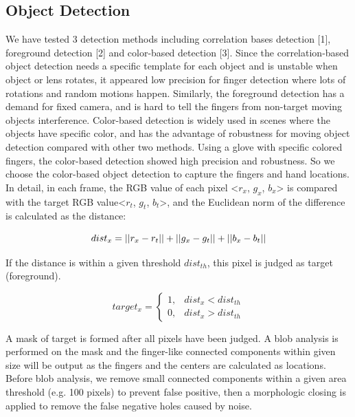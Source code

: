\documentclass[10pt,twocolumn,letterpaper]{article}
\begin{document}
\subsection{Object Detection}

We have tested 3 detection methods including correlation bases detection [1], foreground detection [2] and color-based detection [3]. Since the correlation-based object detection needs a specific template for each object and is unstable when object or lens rotates, it appeared low precision for finger detection where lots of rotations and random motions happen. Similarly, the foreground detection has a demand for fixed camera, and is hard to tell the fingers from non-target moving objects interference. Color-based detection is widely used in scenes where the objects have specific color, and has the advantage of robustness for moving object detection compared with other two methods. Using a glove with specific colored fingers, the color-based detection showed high precision and robustness. So we choose the color-based object detection to capture the fingers and hand locations. In detail, in each frame, the RGB value of each pixel <$r_x$, $g_x$, $b_x$> is compared with the target RGB value<$r_t$, $g_t$, $b_t$>, and the Euclidean norm of the difference is calculated as the distance:

\begin{equation}
dist_x=||r_x-r_t||+||g_x-g_t||+||b_x-b_t||\\
\end{equation}

If the distance is within a given threshold $dist_{th}$, this pixel is judged as target (foreground).

\begin{equation}
	target_x=
\begin{cases}
	1, & dist_x<dist_{th}\\
	0, & dist_x>dist_{th}
\end{cases}
\end{equation}

A mask of target is formed after all pixels have been judged. A blob analysis is performed on the mask and the finger-like connected components within given size will be output as the fingers and the centers are calculated as locations. Before blob analysis, we remove small connected components within a given area threshold (e.g. 100 pixels) to prevent false positive, then a morphologic closing is applied to remove the false negative holes caused by noise.
\end{document}
